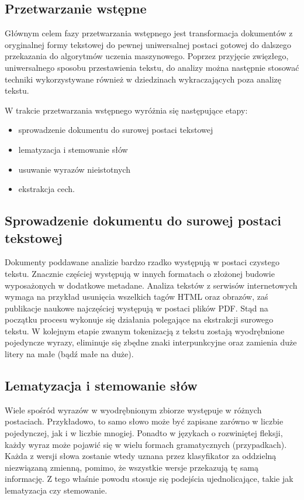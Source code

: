 \documentclass{pracamgr}
\begin{document}
\subsection{Przetwarzanie wstępne}

Głównym celem fazy przetwarzania wstępnego jest transformacja dokumentów z oryginalnej formy tekstowej do pewnej uniwersalnej postaci gotowej do dalszego przekazania do algorytmów uczenia maszynowego. Poprzez przyjęcie zwięzłego, uniwersalnego sposobu przestawienia tekstu, do analizy można następnie stosować techniki wykorzystywane również w dziedzinach wykraczających poza analizę tekstu.

W trakcie przetwarzania wstępnego wyróżnia się następujące etapy:
\begin{itemize} %
    \item sprowadzenie dokumentu do surowej postaci tekstowej
    \item lematyzacja i stemowanie słów
    \item usuwanie wyrazów nieistotnych
    \item ekstrakcja cech.
\end{itemize}

\subsection{Sprowadzenie dokumentu do surowej postaci tekstowej}

Dokumenty poddawane analizie bardzo rzadko występują w postaci czystego tekstu. Znacznie częściej występują w innych formatach o złożonej budowie wyposażonych w dodatkowe metadane. Analiza tekstów z serwisów internetowych wymaga na przykład usunięcia wszelkich tagów HTML oraz obrazów, zaś publikacje naukowe najczęściej występują w postaci plików PDF. Stąd na początku procesu wykonuje się działania polegające na ekstrakcji surowego tekstu. W kolejnym etapie zwanym tokenizacją z tekstu zostają wyodrębnione pojedyncze wyrazy, eliminuje się zbędne znaki interpunkcyjne oraz zamienia duże litery na małe (bądź małe na duże).

\subsection{Lematyzacja i stemowanie słów}

Wiele spośród wyrazów w wyodrębnionym zbiorze występuje w różnych postaciach. Przykładowo, to samo słowo może być zapisane zarówno w liczbie pojedynczej, jak i w liczbie mnogiej. Ponadto w językach o rozwiniętej fleksji, każdy wyraz może pojawić się w wielu formach gramatycznych (przypadkach). Każda z wersji słowa zostanie wtedy uznana przez klasyfikator za oddzielną niezwiązaną zmienną, pomimo, że wszystkie wersje przekazują tę samą informację. Z tego właśnie powodu stosuje się podejścia ujednolicające, takie jak lematyzacja czy stemowanie. 
\end{document}
